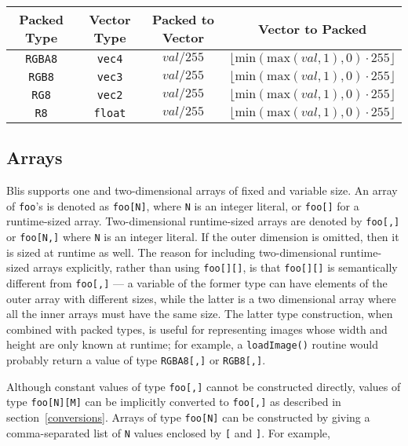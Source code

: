 \documentclass[11pt]{article}
\newcommand{\code}[1]{\texttt{#1}}
\begin{document}
\begin{tabular}{| c | c | c | c |}
\hline
Packed Type & Vector Type & Packed to Vector & Vector to Packed \\
\hline
\code{RGBA8} & \code{vec4} & $\textit{val} / 255$ & $ \lfloor \text{min}(\text{max}(\textit{val}, 1), 0) \cdot 255 \rfloor$ \\
\hline
\code{RGB8} & \code{vec3} & $\textit{val} / 255$ & $ \lfloor \text{min}(\text{max}(\textit{val}, 1), 0) \cdot 255 \rfloor$ \\
\hline
\code{RG8} & \code{vec2} & $\textit{val} / 255$ & $ \lfloor \text{min}(\text{max}(\textit{val}, 1), 0) \cdot 255 \rfloor$ \\
\hline
\code{R8} & \code{float} & $\textit{val} / 255$ & $ \lfloor \text{min}(\text{max}(\textit{val}, 1), 0) \cdot 255 \rfloor$ \\
\hline
\end{tabular}

\subsection{Arrays}

Blis supports one and two-dimensional arrays of fixed and variable size. An array of \code{foo}'s is denoted as \code{foo[N]}, where \code{N} is an integer literal, or \code{foo[]} for a runtime-sized array. Two-dimensional runtime-sized arrays are denoted by \code{foo[,]} or \code{foo[N,]} where \code{N} is an integer literal. If the outer dimension is omitted, then it is sized at runtime as well. The reason for including two-dimensional runtime-sized arrays explicitly, rather than using \code{foo[][]}, is that \code{foo[][]} is semantically different from \code{foo[,]} --- a variable of the former type can have elements of the outer array with different sizes, while the latter is a two dimensional array where all the inner arrays must have the same size. The latter type construction, when combined with packed types, is useful for representing images whose width and height are only known at runtime; for example, a \code{loadImage()} routine would probably return a value of type \code{RGBA8[,]} or \code{RGB8[,]}.

Although constant values of type \code{foo[,]} cannot be constructed directly, values of type \code{foo[N][M]} can be implicitly converted to \code{foo[,]} as described in section~\ref{conversions}. Arrays of type \code{foo[N]} can be constructed by giving a comma-separated list of \code{N} values enclosed by \code{[} and \code{]}. For example,
\end{document}
